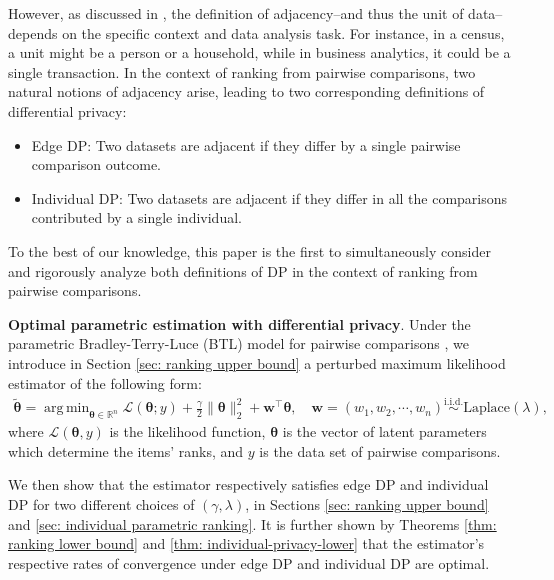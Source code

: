 \documentclass[letterpaper,12pt]{article}
\numberwithin{equation}{section}
\theoremstyle{plain}
\numberwithin{Theorem}{section}
\numberwithin{corollary}{section}
\numberwithin{proposition}{section}
\numberwithin{Lemma}{section}
{
	\theoremstyle{definition}
	\newtheorem{Definition}{Definition}
	\newtheorem{example}{Example}
	\numberwithin{example}{section}
	\newtheorem{fact}{Fact}
	\numberwithin{fact}{section}
	\newtheorem{remark}{Remark}
}
\newcommand{\1}{\mathbbm{1}}
\def\bth{{\boldsymbol{\theta}}}
\DeclareMathOperator*{\argmin}{arg\,min}
\def\R{{\mathbb R}}
\begin{document}
However, as discussed in \cite{NBERc15017}, the definition of adjacency--and thus the unit of data--depends on the specific context and data analysis task. For instance, in a census, a unit might be a person or a household, while in business analytics, it could be a single transaction. In the context of ranking from pairwise comparisons, two natural notions of adjacency arise, leading to two corresponding definitions of differential privacy:
\begin{itemize}
	\item Edge DP: Two datasets are adjacent if they differ by a single pairwise comparison outcome. 
	\item Individual DP: Two datasets are adjacent if they differ in all the comparisons contributed by a single individual.
\end{itemize}
 To the best of our knowledge, this paper is the first to simultaneously consider and rigorously analyze both definitions of DP in the context of ranking from pairwise comparisons.
 
{\bf Optimal parametric estimation with differential privacy}. Under the parametric Bradley-Terry-Luce (BTL) model for pairwise comparisons \cite{bradley1952rank, luce1959individual}, we introduce in Section \ref{sec: ranking upper bound} a perturbed maximum likelihood estimator of the following form:
 \begin{align*}
 	\widetilde \bth = \argmin_{\bth \in \R^n} \mathcal L(\bth; y) + \frac{\gamma}{2}\|\bth\|_2^2 + \bm w^\top \bth, \quad \bm w = (w_1, w_2, \cdots, w_n) \stackrel{\text{i.i.d.}}{\sim }\text{Laplace}(\lambda),
 \end{align*}
where $\mathcal L(\bth, y)$ is the likelihood function, $\bth$ is the vector of latent parameters which determine the items' ranks, and $y$ is the data set of pairwise comparisons. 

We then show that the estimator respectively satisfies edge DP and individual DP for two different choices of $(\gamma, \lambda)$, in Sections \ref{sec: ranking upper bound} and \ref{sec: individual parametric ranking}. It is further shown by Theorems \ref{thm: ranking lower bound} and \ref{thm: individual-privacy-lower} that the estimator's respective rates of convergence under edge DP and individual DP are optimal.
 
\end{document}
